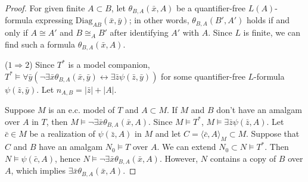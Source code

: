 \documentclass[11pt,reqno]{article}
\theoremstyle{definition}
\theoremstyle{remark}
\begin{document}
\begin{proof}
    For given finite $A\subset B$, let $\theta_{B,A}(\bar x,A)$ be a quantifier-free $L(A)$-formula expressing $\mathrm{Diag}_{AB}(\bar x,\bar y)$; in other words, $\theta_{B,A}(B',A')$ holds if and only if $A\cong A'$ and $B \cong_A B'$ after identifying $A'$ with $A$. Since $L$ is finite, we can find such a formula $\theta_{B,A}(\bar x,A)$.

    ($1\Rightarrow 2$)
    Since $T^*$ is a model companion, $T^*\models \forall \bar y (\neg\exists \bar x\theta_{B,A}(\bar x,\bar y) \leftrightarrow  \exists \bar z \psi(\bar z, \bar y))$ for some quantifier-free $L$-formula $\psi(\bar z,\bar y)$.
    Let $n_{A,B}=|\bar z|+|A|$.

    Suppose $M$ is an e.c. model of $T$ and $A\subset M$.
    If $M$ and $B$ don't have an amalgam over $A$ in $T$, then $M\models \neg \exists \bar x\theta_{B,A}(\bar x,A)$.
    Since $M\models T^*$, $M\models \exists \bar z\psi(\bar z,A)$.
    Let $\bar c\in M$ be a realization of $\psi(\bar z,A)$ in $M$ and let $C=\langle \bar c,A\rangle_M\subset M$.
    Suppose that $C$ and $B$ have an amalgam $N_0\models T$ over $A$. We can extend $N_0\subset N\models T^*$.
    Then $N\models \psi(\bar c, A)$, hence $N\models \neg\exists \bar x\theta_{B,A}(\bar x,A)$. 
    However, $N$ contains a copy of $B$ over $A$, which implies $\exists \bar x \theta_{B,A}(\bar x,A)$. 


\end{proof}
\end{document}
